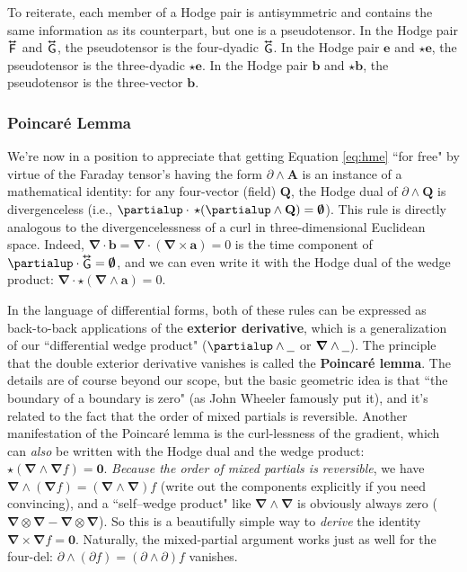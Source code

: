 \documentclass[12pt]{article}
\renewcommand{\vv}[1]{\mathbf{#1}}
\newcommand{\del}{\boldsymbol{\nabla}}
\newcommand{\tightoverset}[2]{%
  \mathop{#2}\limits^{\vbox to -.5ex{\kern-0.75ex\hbox{$#1$}\vss}}}
\newcommand{\inlinedy}[1]{\tightoverset{\text{\tiny$\bm\leftrightarrow$}}{#1}}
\begin{document}
To reiterate, each member of a Hodge pair is antisymmetric and contains the same information as its counterpart, but one is a pseudotensor. In the Hodge pair $\inlinedy{\mathsf{F}}$ and $\inlinedy{\mathsf{G}}$, the pseudotensor is the four-dyadic $\inlinedy{\mathsf{G}}$. In the Hodge pair $\vv e$ and $\star \vv e$, the pseudotensor is the three-dyadic $\star \vv e$. In the Hodge pair $\vv b$ and $\star \vv b$, the pseudotensor is the three-vector $\vv b$.

\subsubsection{Poincar\'e Lemma}\label{sssec:pl}

We're now in a position to appreciate that getting Equation \ref{eq:hme} ``for free" by virtue of the Faraday tensor's having the form $\partialup \wedge \vv A$ is an instance of a mathematical identity: for any four-vector (field) $\vv Q$, the Hodge dual of $\partialup \wedge \vv Q$ is divergenceless (i.e., $\partialup \cdot \, \star ( \partialup \wedge \vv Q ) = \textrm{\mbox{\boldmath $\emptyset$}}$). This rule is directly analogous to the divergencelessness of a curl in three-dimensional Euclidean space. Indeed, $\del \cdot \vv b = \del \cdot ( \del \times \vv a ) = 0$ is the time component of $\partialup \cdot \inlinedy{\mathsf{G}} = \textrm{\mbox{\boldmath $\emptyset$}}$, and we can even write it with the Hodge dual of the wedge product: $\del \cdot \star ( \del \wedge \vv a ) = 0$.

In the language of differential forms, both of these rules can be expressed as back-to-back applications of the \textbf{exterior derivative}, which is a generalization of our ``differential wedge product" ($\partialup \wedge \text{\underline{\hspace{.6em}}}$ or $\del \wedge \text{\underline{\hspace{.6em}}}$). The principle that the double exterior derivative vanishes is called the \textbf{Poincar\'e lemma}. The details are of course beyond our scope, but the basic geometric idea is that ``the boundary of a boundary is zero" (as John Wheeler famously put it), and it's related to the fact that the order of mixed partials is reversible. Another manifestation of the Poincar\'e lemma is the curl-lessness of the gradient, which can \emph{also} be written with the Hodge dual and the wedge product: $\star ( \del \wedge \del f ) = \vv 0 $. \emph{Because the order of mixed partials is reversible}, we have $\del \wedge ( \del f ) = ( \del \wedge \del ) f$ (write out the components explicitly if you need convincing), and a ``self--wedge product" like $ \del \wedge \del $ is obviously always zero ($\del \otimes \del - \del \otimes \del$). So this is a beautifully simple way to \emph{derive} the identity ${ \del \times \del f = \vv 0 }$. Naturally, the mixed-partial argument works just as well for the four-del: ${ \partialup \wedge ( \partialup f ) = ( \partialup \wedge \partialup ) f }$ vanishes.
\end{document}
